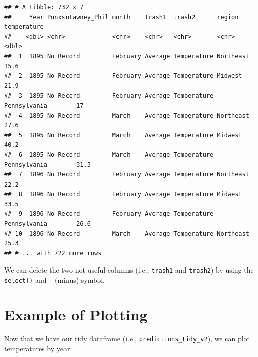 \documentclass[
]{book}
\newenvironment{Shaded}{\begin{snugshade}}{\end{snugshade}}
\newcommand{\DataTypeTok}[1]{\textcolor[rgb]{0.13,0.29,0.53}{#1}}
\newcommand{\KeywordTok}[1]{\textcolor[rgb]{0.13,0.29,0.53}{\textbf{#1}}}
\newcommand{\NormalTok}[1]{#1}
\newcommand{\OperatorTok}[1]{\textcolor[rgb]{0.81,0.36,0.00}{\textbf{#1}}}
\newcommand{\StringTok}[1]{\textcolor[rgb]{0.31,0.60,0.02}{#1}}
\begin{document}
\begin{verbatim}
## # A tibble: 732 x 7
##     Year Punxsutawney_Phil month    trash1  trash2      region       temperature
##    <dbl> <chr>             <chr>    <chr>   <chr>       <chr>              <dbl>
##  1  1895 No Record         February Average Temperature Northeast           15.6
##  2  1895 No Record         February Average Temperature Midwest             21.9
##  3  1895 No Record         February Average Temperature Pennsylvania        17  
##  4  1895 No Record         March    Average Temperature Northeast           27.6
##  5  1895 No Record         March    Average Temperature Midwest             40.2
##  6  1895 No Record         March    Average Temperature Pennsylvania        31.3
##  7  1896 No Record         February Average Temperature Northeast           22.2
##  8  1896 No Record         February Average Temperature Midwest             33.5
##  9  1896 No Record         February Average Temperature Pennsylvania        26.6
## 10  1896 No Record         March    Average Temperature Northeast           25.3
## # ... with 722 more rows
\end{verbatim}

We can delete the two not useful columns (i.e., \texttt{trash1} and \texttt{trash2}) by using the \texttt{select()} and \texttt{-} (minus) symbol.

\begin{Shaded}
\end{Shaded}

\hypertarget{example-of-plotting}{%
\section{Example of Plotting}\label{example-of-plotting}}

Now that we have our tidy dataframe (i.e., \texttt{predictions\_tidy\_v2}), we can plot temperatures by year:

\begin{Shaded}
\end{Shaded}
\end{document}
